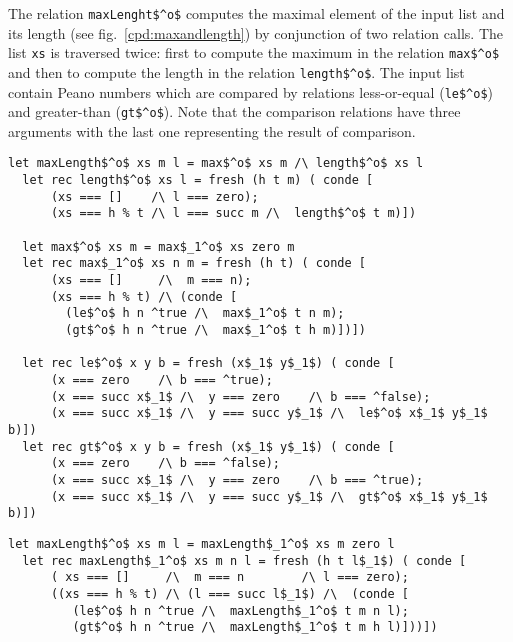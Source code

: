 The relation \lstinline{maxLenght$^o$} computes the maximal element of the input list and its length (see fig.~\ref{cpd:maxandlength}) by conjunction of two relation calls.
The list \lstinline{xs} is traversed twice: first to compute the maximum in the relation \lstinline{max$^o$} and then to compute the length in the relation \lstinline{length$^o$}.
The input list contain Peano numbers which are compared by relations less-or-equal (\lstinline{le$^o$}) and greater-than (\lstinline{gt$^o$}).
Note that the comparison relations have three arguments with the last one representing the result of comparison.

\begin{figure*}[!t]
  \centering
  \begin{minipage}{0.85\textwidth}
\begin{lstlisting}[label={cpd:maxandlength}, caption={Maximum element and length of the list}, captionpos=b, frame=tb]
  let maxLength$^o$ xs m l = max$^o$ xs m /\ length$^o$ xs l
  let rec length$^o$ xs l = fresh (h t m) ( conde [
      (xs === []    /\ l === zero);
      (xs === h % t /\ l === succ m /\  length$^o$ t m)])

  let max$^o$ xs m = max$_1^o$ xs zero m
  let rec max$_1^o$ xs n m = fresh (h t) ( conde [
      (xs === []     /\  m === n);
      (xs === h % t) /\ (conde [
        (le$^o$ h n ^true /\  max$_1^o$ t n m);
        (gt$^o$ h n ^true /\  max$_1^o$ t h m)])])

  let rec le$^o$ x y b = fresh (x$_1$ y$_1$) ( conde [
      (x === zero    /\ b === ^true);
      (x === succ x$_1$ /\  y === zero    /\ b === ^false);
      (x === succ x$_1$ /\  y === succ y$_1$ /\  le$^o$ x$_1$ y$_1$ b)])
  let rec gt$^o$ x y b = fresh (x$_1$ y$_1$) ( conde [
      (x === zero    /\ b === ^false);
      (x === succ x$_1$ /\  y === zero    /\ b === ^true);
      (x === succ x$_1$ /\  y === succ y$_1$ /\  gt$^o$ x$_1$ y$_1$ b)])
  \end{lstlisting}
\end{minipage}
  \begin{minipage}{0.8\textwidth}
\begin{lstlisting}[label={ideal:maxandlength}, caption={Ideal implementation of maxlengtho}, captionpos=b, frame=tb]
  let maxLength$^o$ xs m l = maxLength$_1^o$ xs m zero l
  let rec maxLength$_1^o$ xs m n l = fresh (h t l$_1$) ( conde [
      ( xs === []     /\  m === n        /\ l === zero);
      ((xs === h % t) /\ (l === succ l$_1$) /\  (conde [
         (le$^o$ h n ^true /\  maxLength$_1^o$ t m n l);
         (gt$^o$ h n ^true /\  maxLength$_1^o$ t m h l)]))])
  \end{lstlisting}
\end{minipage}
\end{figure*}

